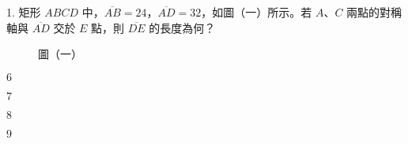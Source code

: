 \documentclass[12pt]{article}
\begin{document}
\begin{problem}
  \item[1.] 矩形 $ABCD$ 中，$\overline{AB} = 24$，$\overline{AD} = 32$，如圖（一）所示。若 $A$、$C$ 兩點的對稱軸與 $\overline{AD}$ 交於 $E$ 點，則 $\overline{DE}$ 的長度為何？
  \begin{figure}[ht]
    \centering
    \vspace*{-1ex}
    \vspace*{-1ex}
    \caption*{圖（一）}
    \vspace*{-2ex}
  \end{figure}
  \begin{choices}
    \item $6$
    \item $7$
    \item $8$
    \item $9$
  \end{choices}
\end{problem}
\end{document}
